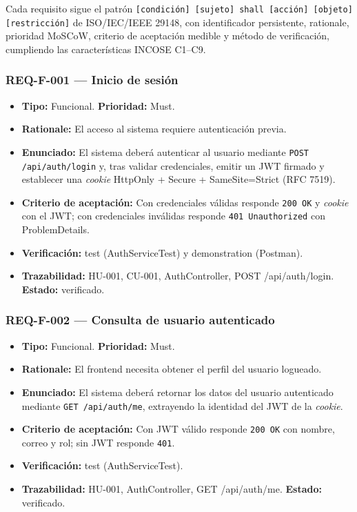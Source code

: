\documentclass[12pt,a4paper]{article}
\begin{document}
Cada requisito sigue el patrón \texttt{[condición] [sujeto] shall [acción] [objeto] [restricción]} de ISO/IEC/IEEE 29148, con identificador persistente, rationale, prioridad MoSCoW, criterio de aceptación medible y método de verificación, cumpliendo las características INCOSE C1--C9.

\subsubsection{REQ-F-001 --- Inicio de sesión}
\begin{itemize}
  \item \textbf{Tipo:} Funcional. \textbf{Prioridad:} Must.
  \item \textbf{Rationale:} El acceso al sistema requiere autenticación previa.
  \item \textbf{Enunciado:} El sistema deberá autenticar al usuario mediante \texttt{POST /api/auth/login} y, tras validar credenciales, emitir un JWT firmado y establecer una \textit{cookie} HttpOnly + Secure + SameSite=Strict (RFC 7519).
  \item \textbf{Criterio de aceptación:} Con credenciales válidas responde \texttt{200 OK} y \textit{cookie} con el JWT; con credenciales inválidas responde \texttt{401 Unauthorized} con ProblemDetails.
  \item \textbf{Verificación:} test (AuthServiceTest) y demonstration (Postman).
  \item \textbf{Trazabilidad:} HU-001, CU-001, AuthController, POST /api/auth/login. \textbf{Estado:} verificado.
\end{itemize}

\subsubsection{REQ-F-002 --- Consulta de usuario autenticado}
\begin{itemize}
  \item \textbf{Tipo:} Funcional. \textbf{Prioridad:} Must.
  \item \textbf{Rationale:} El frontend necesita obtener el perfil del usuario logueado.
  \item \textbf{Enunciado:} El sistema deberá retornar los datos del usuario autenticado mediante \texttt{GET /api/auth/me}, extrayendo la identidad del JWT de la \textit{cookie}.
  \item \textbf{Criterio de aceptación:} Con JWT válido responde \texttt{200 OK} con nombre, correo y rol; sin JWT responde \texttt{401}.
  \item \textbf{Verificación:} test (AuthServiceTest).
  \item \textbf{Trazabilidad:} HU-001, AuthController, GET /api/auth/me. \textbf{Estado:} verificado.
\end{itemize}
\end{document}
